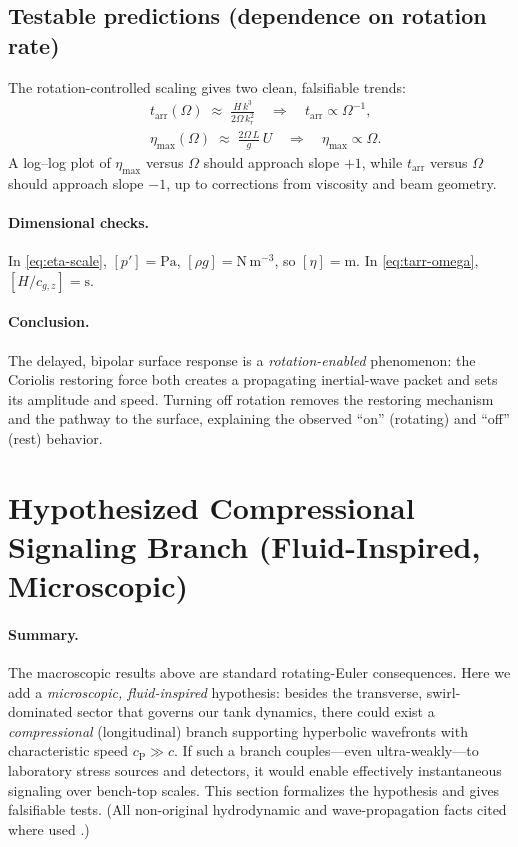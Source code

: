 \documentclass[12pt]{article}
\begin{document}
\subsection{Testable predictions (dependence on rotation rate)}
The rotation-controlled scaling gives two clean, falsifiable trends:
\begin{align}
&t_{\mathrm{arr}}(\Omega)\;\approx\;\frac{H\,k^3}{2\Omega\,k_r^2}
\quad\Rightarrow\quad t_{\mathrm{arr}}\propto \Omega^{-1},
\label{eq:arrive-pred}\\[3pt]
&\eta_{\max}(\Omega)\;\approx\; \frac{2\Omega\,L}{g}\,U \quad\Rightarrow\quad \eta_{\max}\propto \Omega.
\label{eq:eta-pred}
\end{align}
A log--log plot of $\eta_{\max}$ versus $\Omega$ should approach slope $+1$, while $t_{\mathrm{arr}}$ versus $\Omega$ should approach slope $-1$, up to corrections from viscosity and beam geometry.
\vspace{-2pt}

\paragraph{Dimensional checks.}
In \eqref{eq:eta-scale}, $[p']=\mathrm{Pa}$, $[\rho g]=\mathrm{N\,m^{-3}}$, so $[\eta]=\mathrm{m}$. In \eqref{eq:tarr-omega}, $[H/c_{g,z}]=\mathrm{s}$.

\paragraph{Conclusion.}
The delayed, bipolar surface response is a \emph{rotation-enabled} phenomenon: the Coriolis restoring force both creates a propagating inertial-wave packet and sets its amplitude and speed. Turning off rotation removes the restoring mechanism and the pathway to the surface, explaining the observed ``on'' (rotating) and ``off'' (rest) behavior.


\section{Hypothesized Compressional Signaling Branch (Fluid-Inspired, Microscopic)}
\label{sec:compressional-branch}

\paragraph{Summary.}
The macroscopic results above are standard rotating-Euler consequences. Here we add a \emph{microscopic, fluid-inspired} hypothesis: besides the transverse, swirl-dominated sector that governs our tank dynamics, there could exist a \emph{compressional} (longitudinal) branch supporting hyperbolic wavefronts with characteristic speed $c_{\mathrm{P}}\gg c$. If such a branch couples---even ultra-weakly---to laboratory stress sources and detectors, it would enable effectively instantaneous signaling over bench-top scales. This section formalizes the hypothesis and gives falsifiable tests. (All non-original hydrodynamic and wave-propagation facts cited where used \cite{LandauFluids,Lighthill78,Brillouin1960,Jackson1999,Abbott2017PRL,Abbott2017ApJL}.)
\end{document}
